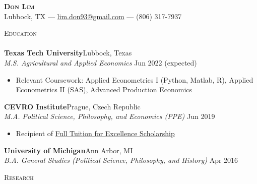 \documentclass[a4paper]{article}
\newcommand{\lineunder} {
    \vspace*{-8pt} \\
    \hspace*{-18pt} \hrulefill \\
}
\newcommand{\header} [1] {
    {\hspace*{-18pt}\vspace*{6pt} \textsc{\large{#1}}}
    \vspace*{-6pt} \lineunder
}
\begin{document}
\vspace*{-40pt}

    

\vspace*{-10pt}
\begin{center}
	{\Huge \scshape \textbf{{Don Lim}}}\\
	Lubbock, TX --- \href{mailto:lim.don93@gmail.com}{lim.don93@gmail.com} --- (806) 317-7937\\
\end{center}

\header{Education}
\vspace{1mm}
\textbf{Texas Tech University}\hfill Lubbock, Texas\\
\textit{M.S. Agricultural and Applied Economics} \hfill Jun 2022 (expected)\\
\begin{itemize}[noitemsep,nolistsep]
	\item Relevant Coursework: Applied Econometrics I (Python, Matlab, R), Applied Econometrics II (SAS), Advanced Production Economics
\end{itemize}
\vspace{1mm}
\textbf{CEVRO Institute}\hfill Prague, Czech Republic\\
\textit{M.A. Political Science, Philosophy, and Economics (PPE)} \hfill Jun 2019\\
\begin{itemize}[noitemsep,nolistsep]
	\item Recipient of \href{http://www.cevroinstitut.cz/en/article/scholarships/}{Full Tuition for Excellence Scholarship}
\end{itemize}
\vspace{1mm}
\textbf{University of Michigan}\hfill Ann Arbor, MI\\
\textit{B.A. General Studies (Political Science, Philosophy, and History)} \hfill Apr 2016\\
\vspace{2mm}

\header{Research}
\vspace{1mm}
\end{document}
